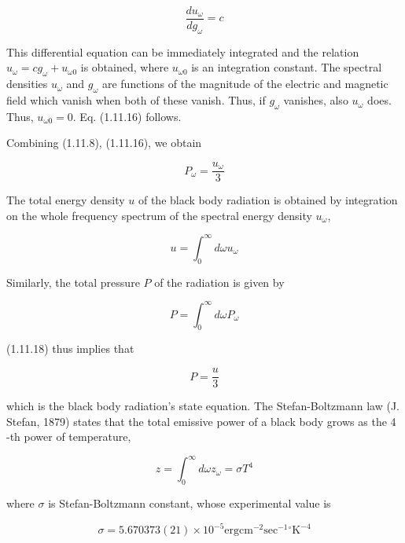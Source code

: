 \documentclass{article}
\begin{document}
\begin{equation*}
\frac{d u_{\omega}}{d g_{\omega}}=c \tag{1.11.17}
\end{equation*}
 

This differential equation can be immediately integrated and the relation $u_{\omega}=c g_{\omega}+u_{\omega 0}$ is obtained, where $u_{\omega 0}$ is an integration constant. The spectral densities $u_{\omega}$ and $g_{\omega}$ are functions of the magnitude of the electric and magnetic field which vanish when both of these vanish. Thus, if $g_{\omega}$ vanishes, also $u_{\omega}$ does. Thus, $u_{\omega 0}=0$. Eq. (1.11.16) follows.

Combining (1.11.8), (1.11.16), we obtain
 
\begin{equation*}
P_{\omega}=\frac{u_{\omega}}{3} \tag{1.11.18}
\end{equation*}
 

The total energy density $u$ of the black body radiation is obtained by integration on the whole frequency spectrum of the spectral energy density $u_{\omega}$,
 
\begin{equation*}
u=\int_{0}^{\infty} d \omega u_{\omega} \tag{1.11.19}
\end{equation*}
 

Similarly, the total pressure $P$ of the radiation is given by
 
\begin{equation*}
P=\int_{0}^{\infty} d \omega P_{\omega} \tag{1.11.20}
\end{equation*}
 
(1.11.18) thus implies that
 
\begin{equation*}
P=\frac{u}{3} \tag{1.11.21}
\end{equation*}
 
which is the black body radiation's state equation.
The Stefan-Boltzmann law (J. Stefan, 1879) states that the total emissive power of a black body grows as the 4 -th power of temperature,
 
\begin{equation*}
z=\int_{0}^{\infty} d \omega z_{\omega}=\sigma T^{4} \tag{1.11.22}
\end{equation*}
 
where $\sigma$ is Stefan-Boltzmann constant, whose experimental value is
 
\begin{equation*}
\sigma=5.670373(21) \times 10^{-5} \mathrm{erg} \mathrm{cm}^{-2} \mathrm{sec}^{-1}{ }^{\circ} \mathrm{K}^{-4} \tag{1.11.23}
\end{equation*}
 
\end{document}

